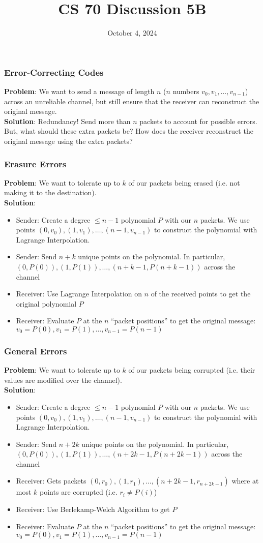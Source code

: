 \documentclass{beamer}
\title{CS 70 Discussion 5B}
\date{October 4, 2024}
\begin{document}
\frame{\titlepage}

\begin{frame}
    \frametitle{Error-Correcting Codes}
    {\bf Problem}: We want to send a message of length $n$ ($n$ numbers $v_0,v_1,\dots,v_{n-1}$) across an unreliable channel, but still ensure that the receiver can reconstruct the original message.\\
    {\bf Solution}: Redundancy! Send more than $n$ packets to account for possible errors. But, what should these extra packets be? How does the receiver reconstruct the original message using the extra packets?
\end{frame}

\begin{frame}
    \frametitle{Erasure Errors}
    {\bf Problem}: We want to tolerate up to $k$ of our packets being erased (i.e. not making it to the destination).\\
    {\bf Solution}: \begin{itemize}
        \item Sender: Create a degree $\leq n-1$ polynomial $P$ with our $n$ packets. We use points $(0,v_0),(1,v_1),\dots,(n-1,v_{n-1})$ to construct the polynomial with Lagrange Interpolation.
        \item Sender: Send $n+k$ unique points on the polynomial. In particular, $(0,P(0)),(1,P(1)),\dots,(n+k-1,P(n+k-1))$ across the channel
        \item Receiver: Use Lagrange Interpolation on $n$ of the received points to get the original polynomial $P$
        \item Receiver: Evaluate $P$ at the $n$ ``packet positions'' to get the original message: $v_0=P(0),v_1=P(1),\dots,v_{n-1}=P(n-1)$
    \end{itemize}
\end{frame}

\begin{frame}
    \frametitle{General Errors}
    {\bf Problem}: We want to tolerate up to $k$ of our packets being corrupted (i.e. their values are modified over the channel).\\
    {\bf Solution}: \begin{itemize}
        \item Sender: Create a degree $\leq n-1$ polynomial $P$ with our $n$ packets. We use points $(0,v_0),(1,v_1),\dots,(n-1,v_{n-1})$ to construct the polynomial with Lagrange Interpolation.
        \item Sender: Send $n+2k$ unique points on the polynomial. In particular, $(0,P(0)),(1,P(1)),\dots,(n+2k-1,P(n+2k-1))$ across the channel
        \item Receiver: Gets packets $(0,r_0),(1,r_1),\dots,(n+2k-1,r_{n+2k-1})$ where at most $k$ points are corrupted (i.e. $r_i\neq P(i)$)
        \item Receiver: Use Berlekamp-Welch Algorithm to get $P$
        \item Receiver: Evaluate $P$ at the $n$ ``packet positions'' to get the original message: $v_0=P(0),v_1=P(1),\dots,v_{n-1}=P(n-1)$
    \end{itemize}
\end{frame}
\end{document}

